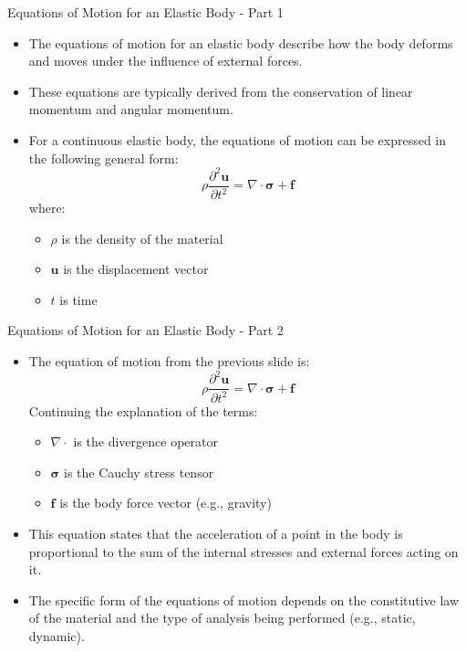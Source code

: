 \documentclass{beamer}
\begin{document}
\begin{frame}{Equations of Motion for an Elastic Body - Part 1}

    \begin{itemize}
        \item The equations of motion for an elastic body describe how the body deforms and moves under the influence of external forces.
        \item These equations are typically derived from the conservation of linear momentum and angular momentum.
        \item For a continuous elastic body, the equations of motion can be expressed in the following general form:
        \begin{equation*}
        \rho \frac{\partial^2 \mathbf{u}}{\partial t^2} = \nabla \cdot \boldsymbol{\sigma} + \mathbf{f}
        \end{equation*}
        where:
        \begin{itemize}
            \item $\rho$ is the density of the material
            \item $\mathbf{u}$ is the displacement vector
            \item $t$ is time
        \end{itemize}
    \end{itemize}
\end{frame}

\begin{frame}{Equations of Motion for an Elastic Body - Part 2}
    \begin{itemize}
        \item The equation of motion from the previous slide is:
        \begin{equation*}
        \rho \frac{\partial^2 \mathbf{u}}{\partial t^2} = \nabla \cdot \boldsymbol{\sigma} + \mathbf{f}
        \end{equation*}
        Continuing the explanation of the terms:
        \begin{itemize}
            \item $\nabla \cdot$ is the divergence operator
            \item $\boldsymbol{\sigma}$ is the Cauchy stress tensor
            \item $\mathbf{f}$ is the body force vector (e.g., gravity)
        \end{itemize}
        \item This equation states that the acceleration of a point in the body is proportional to the sum of the internal stresses and external forces acting on it.
        \item The specific form of the equations of motion depends on the constitutive law of the material and the type of analysis being performed (e.g., static, dynamic).
    \end{itemize}
\end{frame}
\end{document}
